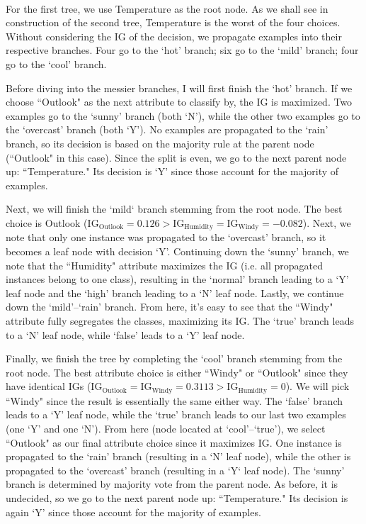 \documentclass[12pt]{article}
\begin{document}
	\paragraph{}
	For the first tree, we use Temperature as the root node. As we shall see in construction of the second tree, Temperature is the worst of the four choices. Without considering the IG of the decision, we propagate examples into their respective branches. Four go to the `hot' branch; six go to the `mild' branch; four go to the `cool' branch. \par
	Before diving into the messier branches, I will first finish the `hot' branch. If we choose ``Outlook" as the next attribute to classify by, the IG is maximized. Two examples go to the `sunny' branch (both `N'), while the other two examples go to the `overcast' branch (both `Y'). No examples are propagated to the `rain' branch, so its decision is based on the majority rule at the parent node (``Outlook" in this case). Since the split is even, we go to the next parent node up: ``Temperature." Its decision is `Y' since those account for the majority of examples. \par
	Next, we will finish the `mild` branch stemming from the root node. The best choice is Outlook ($\text{IG}_{\text{Outlook}} = 0.126 > \text{IG}_{\text{Humidity}} = \text{IG}_{\text{Windy}} = -0.082$). Next, we note that only one instance was propagated to the `overcast' branch, so it becomes a leaf node with decision `Y'. Continuing down the `sunny' branch, we note that the ``Humidity" attribute maximizes the IG (i.e. all propagated instances belong to one class), resulting in the `normal' branch leading to a `Y' leaf node and the `high' branch leading to a `N' leaf node. Lastly, we continue down the `mild'--`rain' branch. From here, it's easy to see that the ``Windy" attribute fully segregates the classes, maximizing its IG. The `true' branch leads to a `N' leaf node, while `false' leads to a `Y' leaf node. \par
	Finally, we finish the tree by completing the `cool' branch stemming from the root node. The best attribute choice is either ``Windy" or ``Outlook" since they have identical IGs ($\text{IG}_{\text{Outlook}} = \text{IG}_{\text{Windy}} = 0.3113 > \text{IG}_{\text{Humidity}} = 0$). We will pick ``Windy" since the result is essentially the same either way. The `false' branch leads to a `Y' leaf node, while the `true' branch leads to our last two examples (one `Y' and one `N'). From here (node located at `cool'--`true'), we select ``Outlook" as our final attribute choice since it maximizes IG. One instance is propagated to the `rain' branch (resulting in a `N' leaf node), while the other is propagated to the `overcast' branch (resulting in a `Y` leaf node). The `sunny' branch is determined by majority vote from the parent node. As before, it is undecided, so we go to the next parent node up: ``Temperature." Its decision is again `Y' since those account for the majority of examples. \par
\end{document}
